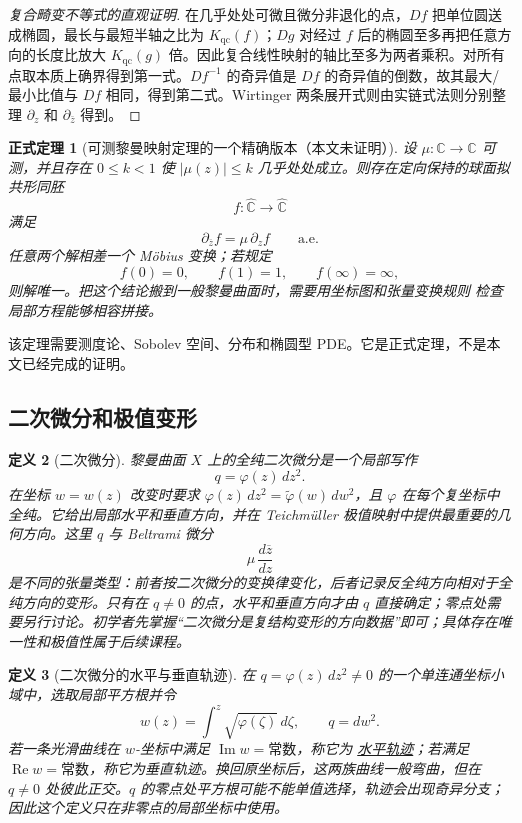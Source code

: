 \documentclass[UTF8,fontset=none,a4paper,11pt]{ctexart}
\theoremstyle{foundation-definition}
\newtheorem{definition}{定义}[section]
\theoremstyle{foundation-theorem}
\newtheorem{theorem}[definition]{正式定理}
\theoremstyle{foundation-proposition}
\theoremstyle{foundation-example}
\theoremstyle{foundation-remark}
\theoremstyle{foundation-theorem}
\newcommand{\term}[2]{\hyperref[#1]{#2}}
\begin{document}
\begin{proof}[复合畸变不等式的直观证明]
在几乎处处可微且微分非退化的点，\(Df\) 把单位圆送成椭圆，最长与最短半轴之比为 \(K_{\mathrm{qc}}(f)\)；\(Dg\) 对经过 \(f\) 后的椭圆至多再把任意方向的长度比放大 \(K_{\mathrm{qc}}(g)\) 倍。因此复合线性映射的轴比至多为两者乘积。对所有点取本质上确界得到第一式。\(Df^{-1}\) 的奇异值是 \(Df\) 的奇异值的倒数，故其最大/最小比值与 \(Df\) 相同，得到第二式。Wirtinger 两条展开式则由实链式法则分别整理 \(\partial_z\) 和 \(\partial_{\bar z}\) 得到。
\end{proof}

\begin{theorem}[可测黎曼映射定理的一个精确版本（本文未证明）]
设 \(\mu:\mathbb C\to\mathbb C\) 可测，并且存在 \(0\leq k<1\) 使
\(|\mu(z)|\leq k\) 几乎处处成立。则存在定向保持的球面拟共形同胚
\[
f:\widehat{\mathbb C}\longrightarrow\widehat{\mathbb C}
\]
满足
\[
\partial_{\overline z}f=\mu\,\partial_zf
\qquad\text{a.e.}
\]
任意两个解相差一个 Möbius 变换；若规定
\[
f(0)=0,\qquad f(1)=1,\qquad f(\infty)=\infty,
\]
则解唯一。把这个结论搬到一般黎曼曲面时，需要用坐标图和张量变换规则
检查局部方程能够相容拼接。
\end{theorem}

该定理需要测度论、Sobolev 空间、分布和椭圆型 PDE。它是正式定理，不是本文已经完成的证明。

\subsection{二次微分和极值变形}

\begin{definition}[二次微分]\label{def:quadratic-differential}
黎曼曲面 \(X\) 上的全纯二次微分是一个局部写作
\[
q=\varphi(z)\,dz^2.
\]
在坐标 \(w=w(z)\) 改变时要求 \(\varphi(z)\,dz^2=\widetilde\varphi(w)\,dw^2\)，且 \(\varphi\) 在每个复坐标中全纯。它给出局部水平和垂直方向，并在 Teichmüller 极值映射中提供最重要的几何方向。这里 \(q\) 与 Beltrami 微分
\[
\mu\,\frac{d\overline z}{dz}
\]
是不同的张量类型：前者按二次微分的变换律变化，后者记录反全纯方向相对于全纯方向的变形。只有在 \(q\neq0\) 的点，水平和垂直方向才由 \(q\) 直接确定；零点处需要另行讨论。初学者先掌握“二次微分是复结构变形的方向数据”即可；具体存在唯一性和极值性属于后续课程。
\end{definition}

\begin{definition}[二次微分的水平与垂直轨迹]\label{def:quadratic-trajectory}
在 \(q=\varphi(z)\,dz^2\neq0\) 的一个单连通坐标小域中，选取局部平方根并令
\[
w(z)=\int^z\sqrt{\varphi(\zeta)}\,d\zeta,
\qquad q=dw^2.
\]
若一条光滑曲线在 \(w\)-坐标中满足 \(\operatorname{Im}w=\text{常数}\)，称它为
\term{def:quadratic-trajectory}{水平轨迹}；若满足 \(\operatorname{Re}w=\text{常数}\)，称它为垂直轨迹。换回原坐标后，这两族曲线一般弯曲，但在 \(q\neq0\) 处彼此正交。\(q\) 的零点处平方根可能不能单值选择，轨迹会出现奇异分支；因此这个定义只在非零点的局部坐标中使用。
\end{definition}
\end{document}
